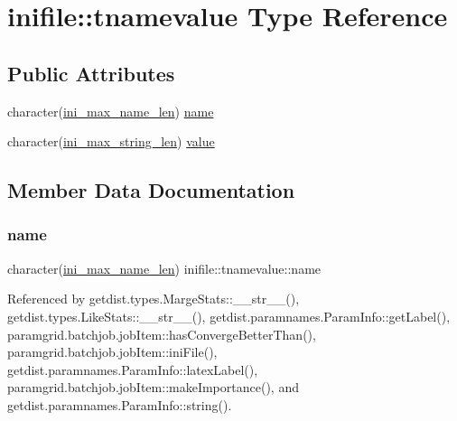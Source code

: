 \hypertarget{structinifile_1_1tnamevalue}{}\section{inifile\+:\+:tnamevalue Type Reference}
\label{structinifile_1_1tnamevalue}
\subsection*{Public Attributes}
\begin{DoxyCompactItemize}
\item 
character(\mbox{\hyperlink{namespaceinifile_aca6c65c541b90a27fa1d196098820185}{ini\+\_\+max\+\_\+name\+\_\+len}}) \mbox{\hyperlink{structinifile_1_1tnamevalue_a4877e796b5159c59e23a4e6e3f98d602}{name}}
\item 
character(\mbox{\hyperlink{namespaceinifile_a32faebf83b580d14b5af965dcb4eebfd}{ini\+\_\+max\+\_\+string\+\_\+len}}) \mbox{\hyperlink{structinifile_1_1tnamevalue_ac027d2bf9ce0ee563af502d89d239e56}{value}}
\end{DoxyCompactItemize}


\subsection{Member Data Documentation}
\mbox{\label{structinifile_1_1tnamevalue_a4877e796b5159c59e23a4e6e3f98d602}} 
\subsubsection{\texorpdfstring{name}{name}}
{\footnotesize\ttfamily character(\mbox{\hyperlink{namespaceinifile_aca6c65c541b90a27fa1d196098820185}{ini\+\_\+max\+\_\+name\+\_\+len}}) inifile\+::tnamevalue\+::name}



Referenced by getdist.\+types.\+Marge\+Stats\+::\+\_\+\+\_\+str\+\_\+\+\_\+(), getdist.\+types.\+Like\+Stats\+::\+\_\+\+\_\+str\+\_\+\+\_\+(), getdist.\+paramnames.\+Param\+Info\+::get\+Label(), paramgrid.\+batchjob.\+job\+Item\+::has\+Converge\+Better\+Than(), paramgrid.\+batchjob.\+job\+Item\+::ini\+File(), getdist.\+paramnames.\+Param\+Info\+::latex\+Label(), paramgrid.\+batchjob.\+job\+Item\+::make\+Importance(), and getdist.\+paramnames.\+Param\+Info\+::string().

